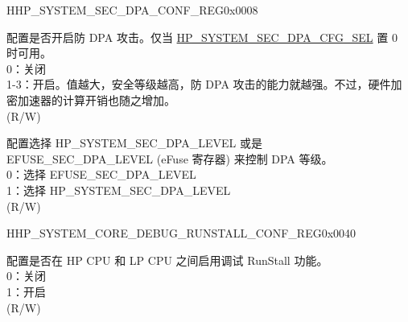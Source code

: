 \begin{register}{H}{HP\_SYSTEM\_SEC\_DPA\_CONF\_REG}{0x0008}\label{regdesc:HPSYSTEMSECDPACONFREG}
%
%
%
\regnewline%
\begin{regdesc}\begin{reglist}
\label{fielddesc:HPSYSTEMSECDPALEVEL}\item [HP\_SYSTEM\_SEC\_DPA\_LEVEL] 配置是否开启防 DPA 攻击。仅当 \hyperref[fielddesc:HPSYSTEMSECDPACFGSEL]{HP\_SYSTEM\_SEC\_DPA\_CFG\_SEL} 置 0 时可用。\\
0：关闭\\
1-3：开启。值越大，安全等级越高，防 DPA 攻击的能力就越强。不过，硬件加密加速器的计算开销也随之增加。\\
(R/W)
\label{fielddesc:HPSYSTEMSECDPACFGSEL}\item [HP\_SYSTEM\_SEC\_DPA\_CFG\_SEL] 配置选择 HP\_SYSTEM\_SEC\_DPA\_LEVEL 或是 EFUSE\_SEC\_DPA\_LEVEL (eFuse 寄存器) 来控制 DPA 等级。\\
0：选择 EFUSE\_SEC\_DPA\_LEVEL\\
1：选择 HP\_SYSTEM\_SEC\_DPA\_LEVEL\\
(R/W)
\end{reglist}\end{regdesc}
\end{register}








\begin{register}{H}{HP\_SYSTEM\_CORE\_DEBUG\_RUNSTALL\_CONF\_REG}{0x0040}\label{regdesc:HPSYSTEMCOREDEBUGRUNSTALLCONFREG}
%
%
\regnewline%
\begin{regdesc}\begin{reglist}
\label{fielddesc:HPSYSTEMCOREDEBUGRUNSTALLENABLE}\item [HP\_SYSTEM\_CORE\_DEBUG\_RUNSTALL\_ENABLE] 配置是否在 HP CPU 和 LP CPU 之间启用调试 RunStall 功能。\\
0：关闭\\
1：开启\\
(R/W)
\end{reglist}\end{regdesc}
\end{register}


